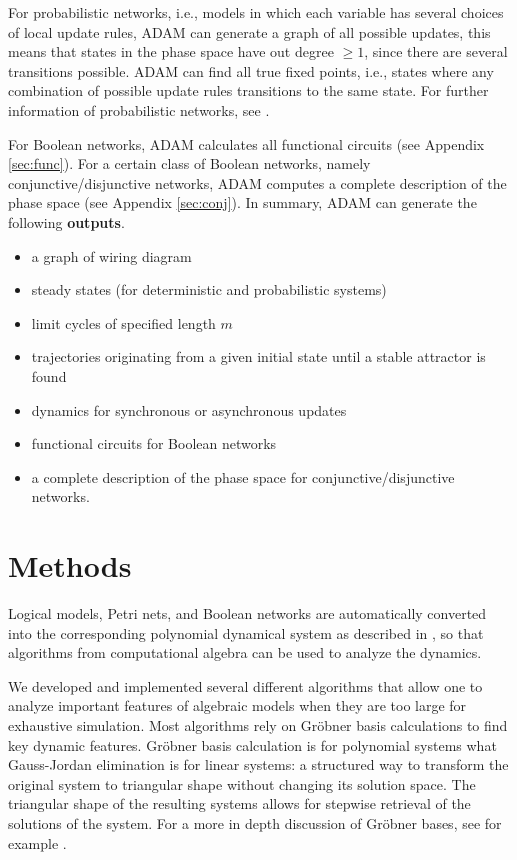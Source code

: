 \documentclass[11pt]{amsart}
\begin{document}
%
%
 
For probabilistic networks, i.e., models in which each variable has several choices of local update rules, ADAM can generate a graph of all possible updates, this means that states in the phase space have out degree $\geq 1$, since there are several transitions possible. ADAM can find all true fixed points, i.e., states where any combination of possible update rules transitions to the same state. For further information of probabilistic networks, see \cite{shmulevich}.
 
For Boolean networks, ADAM calculates all functional circuits (see Appendix \ref{sec:func}). For a certain class of Boolean networks, namely conjunctive/disjunctive networks, ADAM computes a complete description of the phase space (see Appendix \ref{sec:conj}).
In summary, ADAM can generate the following {\bf outputs}.
\begin{itemize}
\item a graph of wiring diagram
\item steady states (for deterministic and probabilistic systems)
\item limit cycles of specified length $m$
\item trajectories originating from a given initial state until a stable
attractor is found
\item dynamics for synchronous or asynchronous updates
\item functional circuits for Boolean networks
\item a complete description of the phase space for conjunctive/disjunctive
networks.
\end{itemize}
\section{Methods}
Logical models, Petri nets, and Boolean networks are automatically converted
into the corresponding polynomial dynamical system as described in
\cite{Alan:Bioinf2010}, so that algorithms from computational
algebra can be used to analyze the dynamics.
 
We developed and implemented several different algorithms that allow one to analyze
important features of algebraic models when they are too large for exhaustive simulation.
Most algorithms rely on Gr\"obner basis calculations to find key dynamic
features. Gr\"obner basis calculation is for polynomial systems what
Gauss-Jordan elimination is for linear systems: a structured way to transform
the original system to triangular shape without changing its solution space.
The triangular shape of the resulting systems allows for stepwise retrieval of the solutions of the system. For a more in depth discussion of Gr\"obner bases, see for example \cite{IVA}.
 
\end{document}
